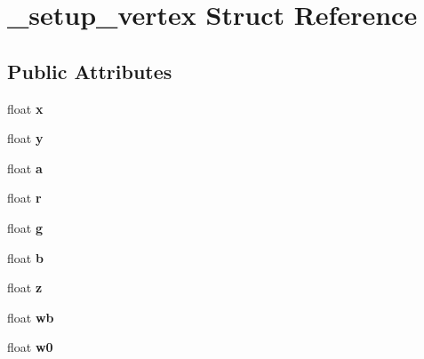 \hypertarget{struct__setup__vertex}{\section{\-\_\-setup\-\_\-vertex Struct Reference}
\label{struct__setup__vertex}
}
\subsection*{Public Attributes}
\begin{DoxyCompactItemize}
\item 
\hypertarget{struct__setup__vertex_a0d774e0d02faa617b267b88b2e95000b}{float {\bfseries x}}\label{struct__setup__vertex_a0d774e0d02faa617b267b88b2e95000b}

\item 
\hypertarget{struct__setup__vertex_a8ed9c94da4b077ff65c0ea725d03d8c4}{float {\bfseries y}}\label{struct__setup__vertex_a8ed9c94da4b077ff65c0ea725d03d8c4}

\item 
\hypertarget{struct__setup__vertex_ab43777819afddf00f71224c74051cc59}{float {\bfseries a}}\label{struct__setup__vertex_ab43777819afddf00f71224c74051cc59}

\item 
\hypertarget{struct__setup__vertex_afbfefd58773c431388358a2202c726e5}{float {\bfseries r}}\label{struct__setup__vertex_afbfefd58773c431388358a2202c726e5}

\item 
\hypertarget{struct__setup__vertex_a8d89b65e5b73188f7ebf822748ca8163}{float {\bfseries g}}\label{struct__setup__vertex_a8d89b65e5b73188f7ebf822748ca8163}

\item 
\hypertarget{struct__setup__vertex_af3efcc0d2812c2477b6d80cb963f9b77}{float {\bfseries b}}\label{struct__setup__vertex_af3efcc0d2812c2477b6d80cb963f9b77}

\item 
\hypertarget{struct__setup__vertex_a63e1dfdae9282101093c56b2ee8645cf}{float {\bfseries z}}\label{struct__setup__vertex_a63e1dfdae9282101093c56b2ee8645cf}

\item 
\hypertarget{struct__setup__vertex_a704213403296a444f40d240c0ef5cef5}{float {\bfseries wb}}\label{struct__setup__vertex_a704213403296a444f40d240c0ef5cef5}

\item 
\hypertarget{struct__setup__vertex_aec1c281e24c60f3cf887f35a0327c7eb}{float {\bfseries w0}}\label{struct__setup__vertex_aec1c281e24c60f3cf887f35a0327c7eb}


\end{DoxyCompactItemize}
